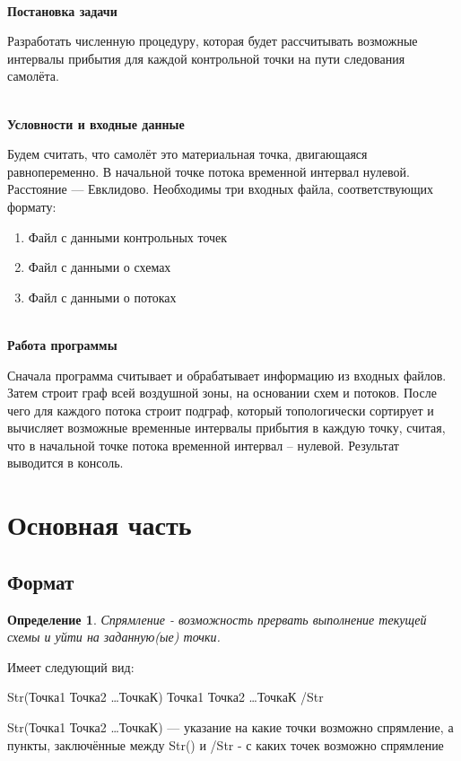 \documentclass[12pt, a4 paper]{article}
\theoremstyle{plain}
\newtheorem{definition}{Определение}
\begin{document}
{\textbf{\\Постановка задачи}}

Разработать численную процедуру, которая будет рассчитывать возможные интервалы прибытия  для каждой контрольной точки на пути следования самолёта.

{\textbf{\\ Условности и входные данные}}

Будем считать, что самолёт это материальная точка, двигающаяся равнопеременно. В начальной точке потока временной интервал нулевой. Расстояние --- Евклидово. 
Необходимы три входных файла, соответствующих формату:
\begin{enumerate}
	\item Файл с данными контрольных точек
	\item Файл с данными о схемах
	\item Файл с данными о потоках
\end{enumerate}

{\textbf{\\ Работа программы}}

Сначала программа считывает и обрабатывает информацию из входных файлов. Затем строит граф всей воздушной зоны, на основании схем и потоков. После чего для каждого потока строит подграф, который топологически сортирует и вычисляет возможные временные интервалы прибытия в каждую точку, считая, что в начальной точке потока временной интервал – нулевой. Результат выводится в консоль.

\newpage

\section{Основная часть}
\subsection{Формат}

\begin{definition}Спрямление - возможность прервать выполнение текущей схемы и уйти на заданную(ые) точки.
\end{definition}

Имеет следующий вид:

Str(Точка1 Точка2  \ldots  ТочкаК) Точка1 Точка2 \ldots ТочкаК /Str

Str(Точка1 Точка2  \ldots  ТочкаК) --- указание на какие точки возможно спрямление, а пункты, заключённые между Str() и /Str - с каких точек возможно спрямление
\end{document}
